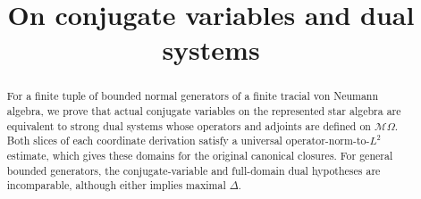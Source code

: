\documentclass[11pt,reqno]{amsart}
\title[On conjugate variables and dual systems]{On conjugate variables and dual systems}
\date{}
\theoremstyle{definition}
\theoremstyle{remark}
\numberwithin{equation}{section}
\newcommand{\M}{\mathcal M}
\begin{document}
\begin{abstract}
For a finite tuple of bounded normal generators of a finite tracial von Neumann algebra, we prove that actual conjugate variables on the represented star algebra are equivalent to strong dual systems whose operators and adjoints are defined on $\M\Omega$.
Both slices of each coordinate derivation satisfy a universal operator-norm-to-$L^2$ estimate, which gives these domains for the original canonical closures.
For general bounded generators, the conjugate-variable and full-domain dual hypotheses are incomparable, although either implies maximal $\Delta$.
\end{abstract}
\maketitle




\appendix




\end{document}
